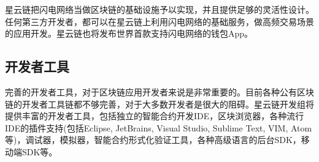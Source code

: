 星云链把闪电网络当做区块链的基础设施予以实现，并且提供足够的灵活性设计。任何第三方开发者，都可以在星云链上利用闪电网络的基础服务，做高频交易场景的应用开发。星云链也将发布世界首款支持闪电网络的钱包App。

\subsection{开发者工具}
完善的开发者工具，对于区块链应用开发者来说是非常重要的。目前各种公有区块链的开发者工具链都不够完善，对于大多数开发者是很大的阻碍。星云链开发组将提供丰富的开发者工具，包括独立的智能合约开发IDE，区块浏览器，各种流行IDE的插件支持(包括Eclipse, JetBrains, Visual Studio, Sublime Text, VIM, Atom等)，调试器，模拟器，智能合约形式化验证工具，各种高级语言的后台SDK，移动端SDK等。
